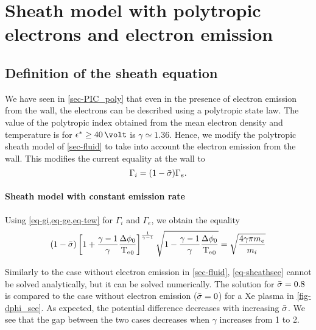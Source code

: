 
\section{Sheath model with polytropic electrons and electron emission}
\label{sec-fluid_poly_see}

\let\oldrightmark=\rightmark
\renewcommand\rightmark{\expandafter\MakeUppercase{Sheath with polytropic electron and SEE}}


\subsection{Definition of the sheath equation} \label{subsec-def_sheat_see}

We have seen in \cref{sec-PIC_poly} that even in the presence of electron emission from the wall, the electrons can be described using a polytropic state law.
The value of the polytropic index obtained from the mean electron density and temperature is for $\crover \geq 40 \,\volt$ is $\gamma \simeq 1.36$.
Hence, we modify the polytropic sheath model of \cref{sec-fluid} to take into account the electron emission from the wall.
This modifies the current equality at the wall to
\begin{equation} \label{eq-see-J_eq}
  \Gamma_i = (1 -  \bar{\sigma }) \Gamma_e.
\end{equation}

\paragraph{Sheath model with constant emission rate\\}

Using \cref{eq-gi,eq-ge,eq-tew} for $\Gamma_i$ and $\Gamma_e$, we obtain the equality
\begin{equation}\label{eq-sheathsee}
  (1 -  \bar{\sigma } )\left[ 1 +\frac{\gamma -1}{\gamma} \frac{ \Delta \phi_0}{ \mathrm{T_e}_0}  \right]^{\frac{1}{\gamma - 1}} \sqrt{1 - \frac{\gamma -1}{\gamma}\frac{\Delta \phi_0}{\mathrm{T_e}_0}} = \sqrt{\frac{4 \gamma \pi m_e}{m_i}}
\end{equation}

Similarly to the case without electron emission in \cref{sec-fluid}, \cref{eq-sheathsee} cannot be solved analytically, but it can be solved numerically.
The solution for $ \bar{\sigma }=0.8$ is compared to the case without electron emission ($ \bar{\sigma }=0$) for a \ac{Xe} plasma in \cref{fig-dphi_see}.
As expected, the potential difference decreases with increasing $ \bar{\sigma }$.
We see that the gap between the two cases decreases when $\gamma$ increases from 1 to 2.

